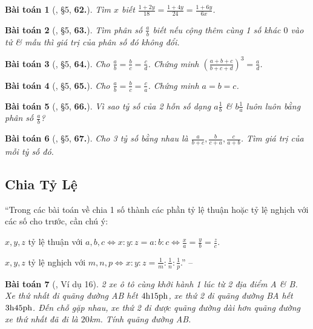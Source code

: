 \documentclass{article}
\numberwithin{equation}{section}
\newtheorem{baitoan}{Bài toán}
\begin{document}
\begin{baitoan}[\cite{Binh_Toan_7_tap_1}, \S5, \textbf{62.}]
	Tìm $x$ biết $\frac{1 + 2y}{18} = \frac{1 + 4y}{24} = \frac{1 + 6y}{6x}$.
\end{baitoan}

\begin{baitoan}[\cite{Binh_Toan_7_tap_1}, \S5, \textbf{63.}]
	Tìm phân số $\frac{a}{b}$ biết nếu cộng thêm cùng 1 số khác $0$ vào tử \& mẫu thì giá trị của phân số đó không đổi.
\end{baitoan}

\begin{baitoan}[\cite{Binh_Toan_7_tap_1}, \S5, \textbf{64.}]
	Cho $\frac{a}{b} = \frac{b}{c} = \frac{c}{d}$. Chứng minh $\left(\frac{a + b + c}{b + c + d}\right)^3 = \frac{a}{d}$.
\end{baitoan}

\begin{baitoan}[\cite{Binh_Toan_7_tap_1}, \S5, \textbf{65.}]
	Cho $\frac{a}{b} = \frac{b}{c} = \frac{c}{a}$. Chứng minh $a = b = c$.
\end{baitoan}

\begin{baitoan}[\cite{Binh_Toan_7_tap_1}, \S5, \textbf{66.}]
	Vì sao tỷ số của 2 hỗn số dạng $a\frac{1}{b}$ \& $b\frac{1}{a}$ luôn luôn bằng phân số $\frac{a}{b}$?
\end{baitoan}

\begin{baitoan}[\cite{Binh_Toan_7_tap_1}, \S5, \textbf{67.}]
	Cho 3 tỷ số bằng nhau là $\frac{a}{b + c},\frac{b}{c + a},\frac{c}{a + b}$. Tìm giá trị của mỗi tỷ số đó.
\end{baitoan}

\subsection{Chia Tỷ Lệ}
``Trong các bài toán về chia 1 số thành các phần tỷ lệ thuận hoặc tỷ lệ nghịch với các số cho trước, cần chú ý:
\begin{enumerate*}
	\item[\textbf{1.}] $x,y,z$ tỷ lệ thuận với $a,b,c\Leftrightarrow x:y:z = a:b:c\Leftrightarrow\frac{x}{a} = \frac{y}{b} = \frac{z}{c}$.
	\item[\textbf{2.}] $x,y,z$ tỷ lệ nghịch với $m,n,p\Leftrightarrow x:y:z = \frac{1}{m}:\frac{1}{n}:\frac{1}{p}$.'' -- \cite{Binh_Toan_7_tap_1}
\end{enumerate*}

\begin{baitoan}[\cite{Binh_Toan_7_tap_1}, Ví dụ 16]
	2 xe ô tô cùng khởi hành 1 lúc từ 2 địa điểm A \& B. Xe thứ nhất đi quãng đường AB hết $\rm4h15ph$, xe thứ 2 đi quãng đường BA hết $\rm3h45ph$. Đến chỗ gặp nhau, xe thứ 2 đi được quãng đường dài hơn quãng đường xe thứ nhất đã đi là $20$\emph{km}. Tính quãng đường AB.
\end{baitoan}
\end{document}
